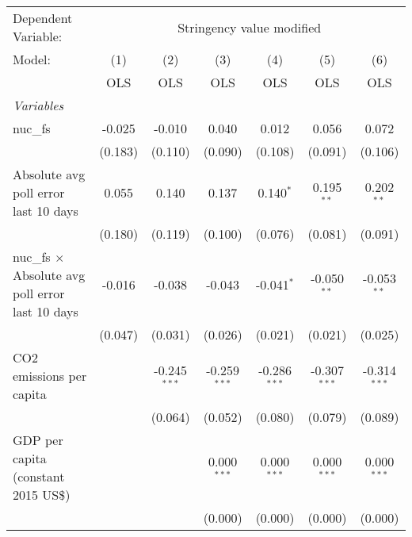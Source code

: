 
\begingroup
\centering
\begin{tabular}{lcccccc}
   \toprule
   Dependent Variable: & \multicolumn{6}{c}{Stringency value modified}\\
   Model:                                                  & (1)     & (2)            & (3)            & (4)            & (5)            & (6)\\  
                                                           &  OLS    & OLS            & OLS            & OLS            & OLS            & OLS\\  
   \midrule
   \emph{Variables}\\
   nuc\_fs                                                 & -0.025  & -0.010         & 0.040          & 0.012          & 0.056          & 0.072\\   
                                                           & (0.183) & (0.110)        & (0.090)        & (0.108)        & (0.091)        & (0.106)\\   
   Absolute avg poll error last 10 days                    & 0.055   & 0.140          & 0.137          & 0.140$^{*}$    & 0.195$^{**}$   & 0.202$^{**}$\\   
                                                           & (0.180) & (0.119)        & (0.100)        & (0.076)        & (0.081)        & (0.091)\\   
   nuc\_fs $\times$ Absolute avg poll error last 10 days   & -0.016  & -0.038         & -0.043         & -0.041$^{*}$   & -0.050$^{**}$  & -0.053$^{**}$\\   
                                                           & (0.047) & (0.031)        & (0.026)        & (0.021)        & (0.021)        & (0.025)\\   
   CO2 emissions per capita                                &         & -0.245$^{***}$ & -0.259$^{***}$ & -0.286$^{***}$ & -0.307$^{***}$ & -0.314$^{***}$\\   
                                                           &         & (0.064)        & (0.052)        & (0.080)        & (0.079)        & (0.089)\\   
   GDP per capita (constant 2015 US\$)                     &         &                & 0.000$^{***}$  & 0.000$^{***}$  & 0.000$^{***}$  & 0.000$^{***}$\\   
                                                           &         &                & (0.000)        & (0.000)        & (0.000)        & (0.000)\\   

\end{tabular}
